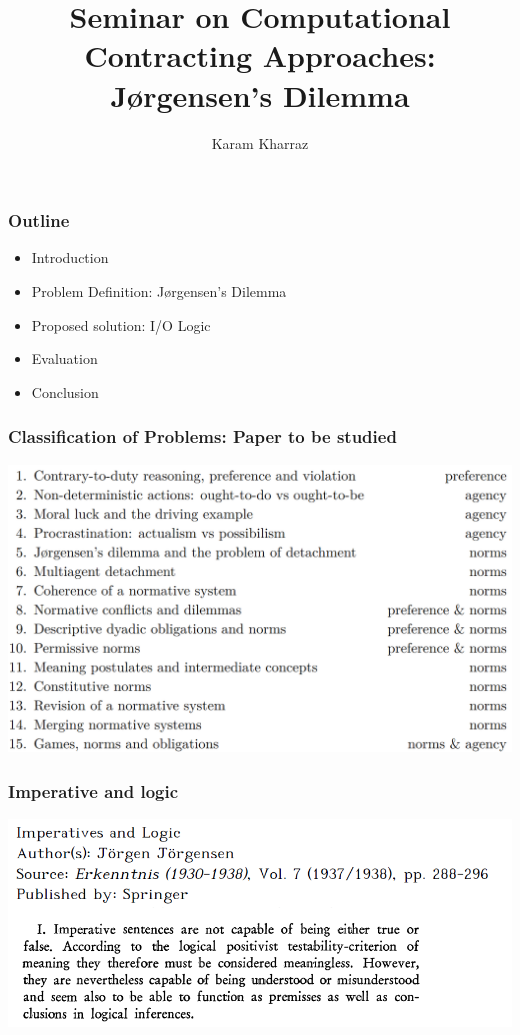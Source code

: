 \documentclass[9pt]{beamer}
\title{Seminar on Computational Contracting Approaches:\\
J\o{}rgensen's Dilemma }
\author[]{Karam Kharraz}
\begin{document}
	
\frame{\titlepage}
	




\begin{frame}
\frametitle{Outline}
\begin{itemize}
	\item Introduction
	\item Problem Definition: J\o{}rgensen's Dilemma
	\item Proposed solution: I/O Logic
	\item Evaluation
	\item Conclusion
\end{itemize}
\end{frame}

\begin{frame}
\frametitle{Classification of Problems: Paper to be studied}
\includegraphics[scale=0.55]{class.png}
\end{frame}

\begin{frame}
\frametitle{Imperative and logic}
\includegraphics[scale=0.50]{jorgensen.png}
\end{frame}
\end{document}
